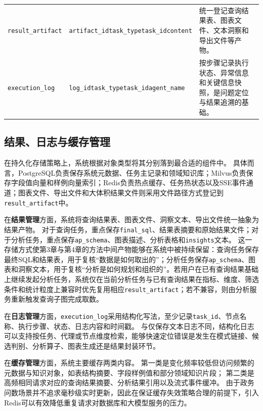 \begin{table}[!t]
\begin{tabular}{>{\centering\arraybackslash}m{3.4cm}>{\raggedright\arraybackslash}m{3.3cm}m{5.6cm}}
		\texttt{result\_artifact} & \texttt{artifact\_id}\newline\texttt{task\_type}\newline\texttt{task\_id}\newline\texttt{content} & 统一登记查询结果表、图表文件、文本洞察和导出文件等产物。 \\
		\texttt{execution\_log} & \texttt{log\_id}\newline\texttt{task\_type}\newline\texttt{task\_id}\newline\texttt{agent\_name} & 按步骤记录执行状态、异常信息和关键信息快照，是问题定位与结果追溯的基础。 \\
		\bottomrule
	\end{tabular}
	\renewcommand{\arraystretch}{1.0}
\end{table}

\subsection{结果、日志与缓存管理}

在持久化存储策略上，系统根据对象类型将其分别落到最合适的组件中。
具体而言，PostgreSQL负责保存系统元数据、任务主记录和领域知识库；Milvus负责保存字段值向量和样例向量索引；Redis负责热点缓存、任务热状态以及SSE事件通道；图表文件、导出文件和大体积结果文件则采用文件路径方式登记到\texttt{result\_artifact}中。

在\textbf{结果管理}方面，系统将查询结果表、图表文件、洞察文本、导出文件统一抽象为结果产物。
对于查询任务，重点保存\texttt{final\_sql}、结果表摘要和原始结果文件；对于分析任务，重点保存\texttt{ap\_schema}、图表描述、分析表格和\texttt{insights}文本。
这一存储方式使第3章与第4章的方法中间产物能够在系统中被持续保留：查询任务保存最终SQL和结果表，用于复核“数据是如何取出的”；分析任务保存\texttt{ap\_schema}、图表和洞察文本，用于复核“分析是如何规划和组织的”。若用户在已有查询结果基础上继续发起分析任务，系统仅在当前分析任务与已有查询结果在指标、维度、筛选条件和统计粒度上兼容时优先复用相应\texttt{result\_artifact}；若不兼容，则由分析服务重新触发查询子图完成取数。

在\textbf{日志管理}方面，\texttt{execution\_log}采用结构化写法，至少记录\texttt{task\_id}、节点名称、执行步骤、状态、日志内容和时间戳。
与仅保存文本日志不同，结构化日志可以支持按任务、代理或节点维度检索，能够快速定位错误是发生在模式链接、候选判别、分析算子、图表生成还是结果封装环节。

在\textbf{缓存管理}方面，系统主要缓存两类内容。
第一类是变化频率较低但访问频繁的元数据与知识对象，如表结构摘要、字段样例值和部分领域知识片段；
第二类是高频相同请求对应的查询结果摘要、分析结果引用以及流式事件缓冲。
由于政务问数场景并不追求毫秒级实时更新，因此在保证缓存失效策略合理的前提下，引入Redis可以有效降低重复请求对数据库和大模型服务的压力。

